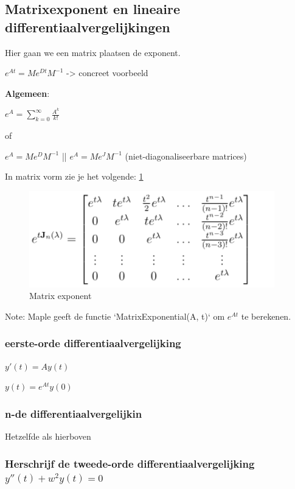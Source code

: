 \documentclass[a4paper]{report}
\begin{document}
\subsection{Matrixexponent en lineaire differentiaalvergelijkingen}

Hier gaan we een matrix plaatsen de exponent.

$e^{At} = M e^{Dt} M^{-1}$ -> concreet voorbeeld

\textbf{Algemeen}:

$e^{A} = \sum_{k=0}^{\infty} \frac{A^k}{k!}$

of

$e^{A} = M e^{D} M^{-1}$ || $e^{A} = M e^{J} M^{-1}$ (niet-diagonaliseerbare matrices)

In matrix vorm zie je het volgende: \ref{fig:matrix_expo}

\begin{figure}[htbp!]
	\begin{center}
		\includegraphics[width=0.95\textwidth]{./images/matrix_expo.png}
	\end{center}
	\caption{Matrix exponent}
	\label{fig:matrix_expo}
\end{figure}

Note: Maple geeft de functie `MatrixExponential(A, t)` om $e^{At}$ te berekenen.

\subsubsection{eerste-orde differentiaalvergelijking}

$y'(t) = Ay(t)$

$y(t) = e^{At} y(0)$

\subsubsection{n-de differentiaalvergelijkin}

Hetzelfde als hierboven

\subsubsection{Herschrijf de tweede-orde differentiaalvergelijking $y''(t) + w^2 y(t) = 0$}
\end{document}
